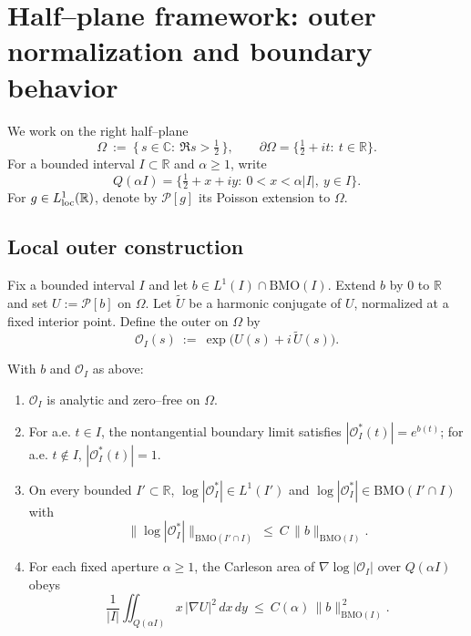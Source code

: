 
\section*{Half–plane framework: outer normalization and boundary behavior}

We work on the right half–plane
\[
\Omega\ :=\ \{\,s\in\mathbb{C}:\ \Re s>\tfrac12\,\},\qquad \partial\Omega=\{\tfrac12+it:\ t\in\mathbb{R}\}.
\]
For a bounded interval $I\subset\mathbb{R}$ and $\alpha\ge1$, write
\[
Q(\alpha I)=\bigl\{\tfrac12+x+iy:\ 0<x<\alpha|I|,\ y\in I\bigr\}.
\]
For $g\in L^1_{\rm loc}(\mathbb{R})$, denote by $\mathcal P[g]$ its Poisson extension to $\Omega$.

\subsection*{Local outer construction}

\begin{definition}\label{hp:def:outer}
Fix a bounded interval $I$ and let $b\in L^1(I)\cap \mathrm{BMO}(I)$.
Extend $b$ by $0$ to $\mathbb{R}$ and set $U:=\mathcal P[b]$ on $\Omega$.
Let $\widetilde U$ be a harmonic conjugate of $U$, normalized at a fixed interior point.
Define the outer on $\Omega$ by
\[ \mathcal O_I(s)\ :=\ \exp\big(U(s)+i\,\widetilde U(s)\big). \]
\end{definition}

\begin{proposition}\label{hp:prop:outer-props}
With $b$ and $\mathcal O_I$ as above:
\begin{enumerate}
\item $\mathcal O_I$ is analytic and zero–free on $\Omega$.
\item For a.e. $t\in I$, the nontangential boundary limit satisfies $|\mathcal O_I^*(t)|=e^{b(t)}$; for a.e. $t\notin I$, $|\mathcal O_I^*(t)|=1$.
\item On every bounded $I'\subset\mathbb{R}$, $\log|\mathcal O_I^*|\in L^1(I')$ and $\log|\mathcal O_I^*|\in \mathrm{BMO}(I'\cap I)$ with
\[ \|\log|\mathcal O_I^*|\|_{\mathrm{BMO}(I'\cap I)}\ \le\ C\,\|b\|_{\mathrm{BMO}(I)}. \]
\item For each fixed aperture $\alpha\ge1$, the Carleson area of $\nabla\log|\mathcal O_I|$ over $Q(\alpha I)$ obeys
\[ \frac{1}{|I|}\iint_{Q(\alpha I)} x\,|\nabla U|^2\,dx\,dy\ \le\ C(\alpha)\,\|b\|_{\mathrm{BMO}(I)}^{\,2}. \]
\end{enumerate}
\end{proposition}

